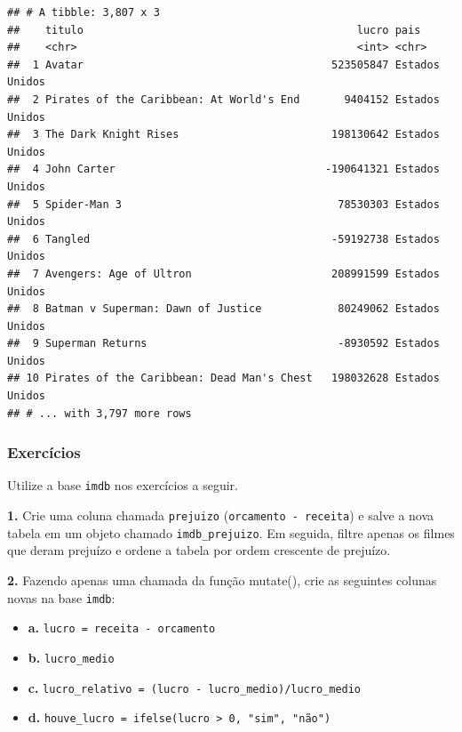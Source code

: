 \documentclass[
]{book}
\begin{document}
\begin{verbatim}
## # A tibble: 3,807 x 3
##    titulo                                           lucro pais          
##    <chr>                                            <int> <chr>         
##  1 Avatar                                       523505847 Estados Unidos
##  2 Pirates of the Caribbean: At World's End       9404152 Estados Unidos
##  3 The Dark Knight Rises                        198130642 Estados Unidos
##  4 John Carter                                 -190641321 Estados Unidos
##  5 Spider-Man 3                                  78530303 Estados Unidos
##  6 Tangled                                      -59192738 Estados Unidos
##  7 Avengers: Age of Ultron                      208991599 Estados Unidos
##  8 Batman v Superman: Dawn of Justice            80249062 Estados Unidos
##  9 Superman Returns                              -8930592 Estados Unidos
## 10 Pirates of the Caribbean: Dead Man's Chest   198032628 Estados Unidos
## # ... with 3,797 more rows
\end{verbatim}

\hypertarget{exercuxedcios-14}{%
\subsubsection*{Exercícios}\label{exercuxedcios-14}}

Utilize a base \texttt{imdb} nos exercícios a seguir.

\textbf{1.} Crie uma coluna chamada \texttt{prejuizo} (\texttt{orcamento\ -\ receita}) e salve a nova tabela em um objeto chamado \texttt{imdb\_prejuizo}. Em seguida, filtre apenas os filmes que deram prejuízo e ordene a tabela por ordem crescente de prejuízo.

\textbf{2.} Fazendo apenas uma chamada da função mutate(), crie as seguintes colunas novas na base \texttt{imdb}:

\begin{itemize}
\item
  \textbf{a.} \texttt{lucro\ =\ receita\ -\ orcamento}
\item
  \textbf{b.} \texttt{lucro\_medio}
\item
  \textbf{c.} \texttt{lucro\_relativo\ =\ (lucro\ -\ lucro\_medio)/lucro\_medio}
\item
  \textbf{d.} \texttt{houve\_lucro\ =\ ifelse(lucro\ \textgreater{}\ 0,\ "sim",\ "não")}
\end{itemize}
\end{document}
